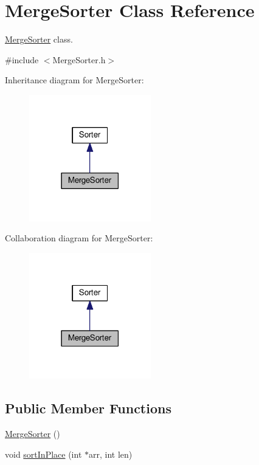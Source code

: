 \hypertarget{class_merge_sorter}{}\section{Merge\+Sorter Class Reference}
\label{class_merge_sorter}


\hyperlink{class_merge_sorter}{Merge\+Sorter} class.  




{\ttfamily \#include $<$Merge\+Sorter.\+h$>$}



Inheritance diagram for Merge\+Sorter\+:\nopagebreak
\begin{figure}[H]
\begin{center}
\leavevmode
\includegraphics[width=150pt]{class_merge_sorter__inherit__graph}
\end{center}
\end{figure}


Collaboration diagram for Merge\+Sorter\+:\nopagebreak
\begin{figure}[H]
\begin{center}
\leavevmode
\includegraphics[width=150pt]{class_merge_sorter__coll__graph}
\end{center}
\end{figure}
\subsection*{Public Member Functions}
\begin{DoxyCompactItemize}
\item 
\hyperlink{class_merge_sorter_a6a1d4829efdea1e94f9ed2f61d32022c}{Merge\+Sorter} ()
\item 
void \hyperlink{class_merge_sorter_a1137eeb25786449a1363bac71f81014d}{sort\+In\+Place} (int $\ast$arr, int len)
\end{DoxyCompactItemize}
